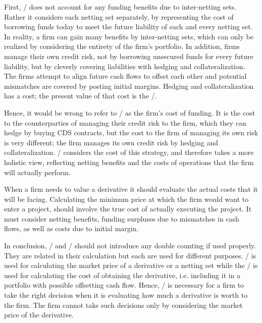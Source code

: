 \documentclass[main.tex]{subfiles}
\begin{document}
    First, \DVA/ does not account for any funding benefits due to inter-netting sets.
    Rather it considers each netting set separately, by representing the cost 
    of borrowing funds today to meet the future liability of each and every netting set.
    In reality, a firm can gain many benefits by inter-netting sets,
    which can only be realized by considering the entirety of the firm's portfolio.
    In addition, firms manage their own credit risk,
    not by borrowing unsecured funds for every future liability,
    but by cleverly covering liabilities
    with hedging and collateralization.
    The firms attempt to align future cash flows to offset each other
    and potential mismatches are covered by posting initial margins. 
    Hedging and collateralization has a cost; 
    the present value of that cost is the \FVA/.

    Hence, it would be wrong to refer to \DVA/ as the firm's cost of funding.
    It is the cost to the counterparties of managing their credit risk to the firm,
    which they can hedge by buying CDS contracts,
    but the cost to the firm of managing its own risk is very different;
    the firm manages its own credit risk by hedging and collateralization.
    \FVA/ considers the cost of this strategy, and therefore takes a more holistic view, 
    reflecting netting benefits and the costs of operations that the firm will actually perform.

    When a firm needs to value a derivative 
    it should evaluate the actual costs that it will be facing.
    Calculating the minimum price at which the firm would want to enter a project,
    should involve the true cost of actually executing the project.
    It must consider netting benefits, funding surpluses due to mismatches in cash flows,
    as well as costs due to initial margin.

    In conclusion, \FVA/ and \DVA/ should not introduce any double counting if used properly.
    They are related in their calculation but each are used for different purposes.
    \DVA/ is used for calculating the market price of a derivative or a netting set
    while the \FVA/ is used for calculating the cost of obtaining the derivative,
    i.e. including it in a portfolio with possible offsetting cash flow.
    Hence, \FVA/ is necessary for a firm to take the right decision when it is evaluating
    how much a derivative is worth to the firm.
    The firm cannot take such decisions only by considering the market price of the derivative.
    
\end{document}
